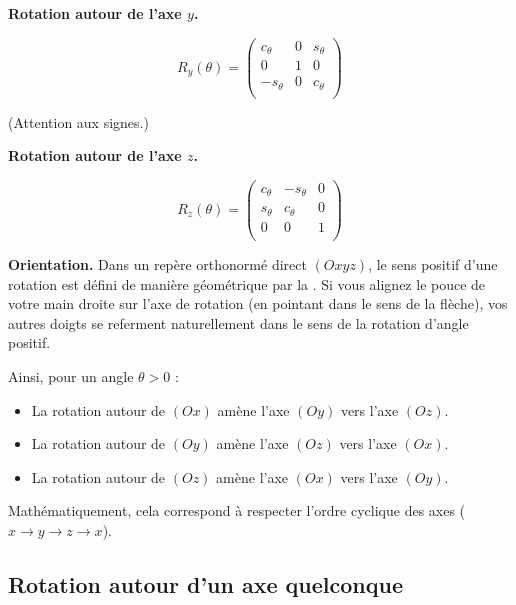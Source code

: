 \documentclass[11pt,class=report,crop=false]{standalone}
\begin{document}
\medskip

\textbf{Rotation autour de l'axe $y$.}

$$R_y(\theta) = 
\begin{pmatrix}
c_\theta & 0 & s_\theta \\
0 & 1 & 0 \\
-s_\theta & 0 &  c_\theta \\
\end{pmatrix}
$$

(Attention aux signes.)




\medskip

\textbf{Rotation autour de l'axe $z$.}

$$R_z(\theta) = 
\begin{pmatrix}
c_\theta & - s_\theta & 0 \\
s_\theta & c_\theta & 0 \\
0 & 0 & 1 \\
\end{pmatrix}
$$




\textbf{Orientation.}
Dans un repère orthonormé direct $(Oxyz)$, le sens positif d'une rotation est défini de manière géométrique par la . Si vous alignez le pouce de votre main droite sur l'axe de rotation (en pointant dans le sens de la flèche), vos autres doigts se referment naturellement dans le sens de la rotation d'angle positif.

Ainsi, pour un angle $\theta > 0$ :
\begin{itemize}
	\item La rotation autour de $(Ox)$ amène l'axe $(Oy)$ vers l'axe $(Oz)$.
	\item La rotation autour de $(Oy)$ amène l'axe $(Oz)$ vers l'axe $(Ox)$.
	\item La rotation autour de $(Oz)$ amène l'axe $(Ox)$ vers l'axe $(Oy)$.
\end{itemize}
Mathématiquement, cela correspond à respecter l'ordre cyclique des axes ($x \to y \to z \to x$). 



\subsection{Rotation autour d'un axe quelconque}
\end{document}
